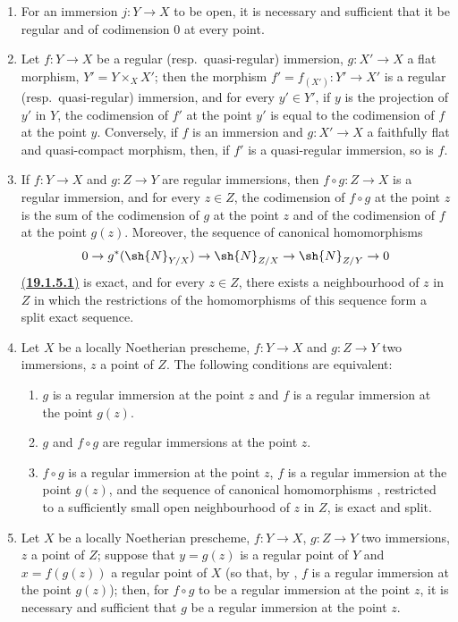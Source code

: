 \begin{proposition}[19.1.5]
\label{IV.19.1.5}
\medskip\noindent
\begin{enumerate}[label=(\roman*)]
  \item For an immersion $j:Y\to X$ to be open, it is necessary and sufficient that it be regular and of codimension $0$ at every point.
  \item Let $f:Y\to X$ be a regular (resp.\ quasi-regular) immersion, $g:X'\to X$ a flat morphism, $Y'=Y\times_X X'$; then the morphism $f'=f_{(X')}:Y'\to X'$ is a regular (resp.\ quasi-regular) immersion, and for every $y'\in Y'$, if $y$ is the projection of $y'$ in $Y$, the codimension of $f'$ at the point $y'$ is equal to the codimension of $f$ at the point $y$.
Conversely, if $f$ is an immersion and $g:X'\to X$ a faithfully flat and quasi-compact morphism, then, if $f'$ is a quasi-regular immersion, so is $f$.
  \item If $f:Y\to X$ and $g:Z\to Y$ are regular immersions, then $f\circ g:Z\to X$ is a regular immersion, and for every $z\in Z$, the codimension of $f\circ g$ at the point $z$ is the sum of the codimension of $g$ at the point $z$ and of the codimension of $f$ at the point $g(z)$.
Moreover, the sequence of canonical homomorphisms 
\[
  0\to g^*(\sh{N}_{Y/X})\to\sh{N}_{Z/X}\to\sh{N}_{Z/Y}\to 0
\]
{\hyperlink{ega4.c04.item.19-1-5-1}{(\textbf{19.1.5.1})}}
\label{IV.19.1.5.1}
is exact, and for every $z\in Z$, there exists a neighbourhood of $z$ in $Z$ in which the restrictions of the homomorphisms of this sequence form a split exact sequence.
  \item Let $X$ be a locally Noetherian prescheme, $f:Y\to X$ and $g:Z\to Y$ two immersions, $z$ a point of $Z$.
The following conditions are equivalent:
  \begin{enumerate}[label=\emph{\alph*)}]
    \item $g$ is a regular immersion at the point $z$ and $f$ is a regular immersion at the point $g(z)$.
    \item $g$ and $f\circ g$ are regular immersions at the point $z$.
    \item $f\circ g$ is a regular immersion at the point $z$, $f$ is a regular immersion at the point $g(z)$, and the sequence of canonical homomorphisms , restricted to a sufficiently small open neighbourhood of $z$ in $Z$, is exact and split.
  \end{enumerate}
  \item Let $X$ be a locally Noetherian prescheme, $f:Y\to X$, $g:Z\to Y$ two immersions, $z$ a point of $Z$; suppose that $y=g(z)$ is a regular point of $Y$ and $x=f(g(z))$ a regular point
of $X$ (so that, by , $f$ is a regular immersion at the point $g(z)$); then,
for $f\circ g$ to be a regular immersion at the point $z$, it is necessary and sufficient that $g$ be a regular immersion at the point $z$.
\end{enumerate}
\end{proposition}

